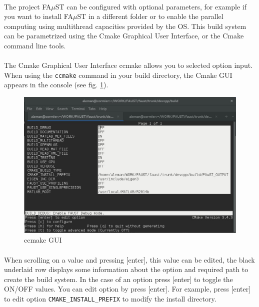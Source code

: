 \paragraph{}The project FA$\mu$ST can be configured with optional parameters, for example if you want to install FA$\mu$ST in a different folder or to enable the parallel computing using multithread capacities provided by the OS. This build system can be parametrized using the Cmake Graphical User Interface, or the Cmake command line tools. 

\paragraph{}The Cmake Graphical User Interface ccmake allows you to selected option input. When using the \texttt{ccmake} command in your build directory, the Cmake GUI appears in the console (see fig. \ref{fig:ccmake}).

\begin{figure}[!h] %
\centering
\includegraphics[scale=0.5]{images/ccmake.jpg}
\caption{ccmake GUI}
\label{fig:ccmake}
\end{figure}


\paragraph{}When scrolling on a value and pressing [enter], this value can be edited, the black underlaid row displays some information about the option and required path to create the build system. In the case of an option press [enter] to toggle the ON/OFF values. You can edit option by press [enter]. For example, press [enter] to edit option \texttt{CMAKE\_INSTALL\_PREFIX} to modify the install directory. 
